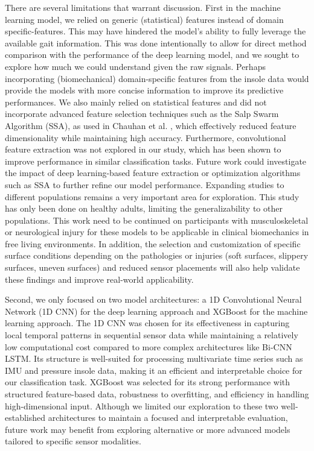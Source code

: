 \documentclass[sensors,article,submit,pdftex,moreauthors]{Definitions/mdpi}
\begin{document}
There are several limitations that warrant discussion. First in the machine learning model, we relied on generic (statistical) features instead of domain specific-features. This may have hindered the model's ability to fully leverage the available gait information. This was done intentionally to allow for direct method comparison with the performance of the deep learning model, and we sought to explore how much we could understand given the raw signals. Perhaps incorporating (biomechanical) domain-specific features from the insole data would provide the models with more concise information to improve its predictive performances. 
We also mainly relied on statistical features and did not incorporate advanced feature selection techniques such as the Salp Swarm Algorithm (SSA), as used in Chauhan et al. \cite{chauhan2025classifying}, which effectively reduced feature dimensionality while maintaining high accuracy. Furthermore, convolutional feature extraction was not explored in our study, which has been shown to improve performance in similar classification tasks. Future work could investigate the impact of deep learning-based feature extraction or optimization algorithms such as SSA to further refine our model performance.
Expanding studies to different populations remains a very important area for exploration. This study has only been done on healthy adults, limiting the generalizability to other populations. This work need to be continued on participants with musculoskeletal or neurological injury for these models to be applicable in clinical biomechanics in free living environments.
In addition, the selection and customization of specific surface conditions depending on the pathologies or injuries (soft surfaces, slippery surfaces, uneven surfaces) and reduced sensor placements will also help validate these findings and improve real-world applicability.

Second, we only focused on two model architectures: a 1D Convolutional Neural Network (1D CNN) for the deep learning approach and XGBoost for the machine learning approach. The 1D CNN was chosen for its effectiveness in capturing local temporal patterns in sequential sensor data while maintaining a relatively low computational cost compared to more complex architectures like Bi-CNN LSTM. Its structure is well-suited for processing multivariate time series such as IMU and pressure insole data, making it an efficient and interpretable choice for our classification task. XGBoost was selected for its strong performance with structured feature-based data, robustness to overfitting, and efficiency in handling high-dimensional input. Although we limited our exploration to these two well-established architectures to maintain a focused and interpretable evaluation, future work may benefit from exploring alternative or more advanced models tailored to specific sensor modalities.
\end{document}

